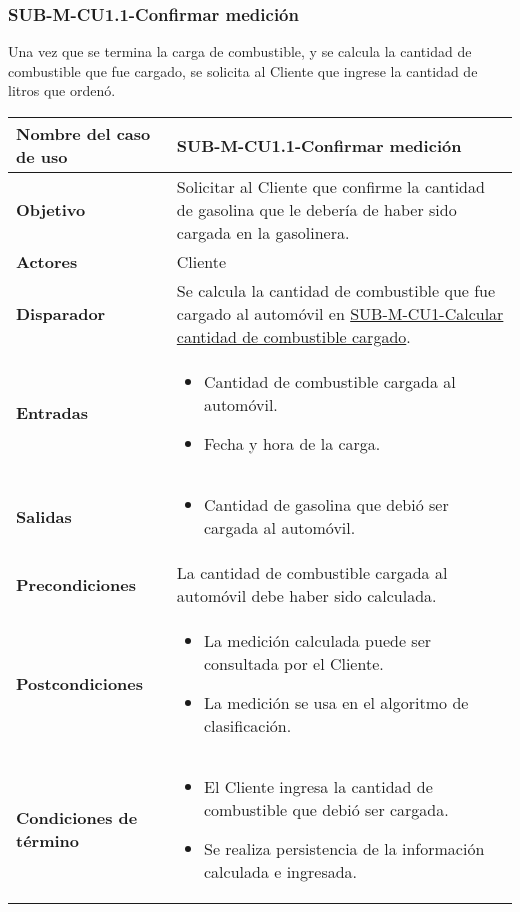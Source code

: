 \subsubsection{SUB-M-CU1.1-Confirmar medición}\label{SUB-M-CU1.1}
Una vez que se termina la carga de combustible, y se calcula la cantidad de combustible que fue cargado, se solicita al Cliente que ingrese la cantidad de litros que ordenó.

\begin{longtable}{|J{5cm}|J{10.3cm}|}
	\hline
	\textbf{Nombre del caso de uso} &
		SUB-M-CU1.1-Confirmar medición \\ \hline
	\textbf{Objetivo} &
		Solicitar al Cliente que confirme la cantidad de gasolina que le debería de haber sido cargada en la gasolinera. \\ \hline
	\textbf{Actores} &
		Cliente \\ \hline 
	\textbf{Disparador} & 
		Se calcula la cantidad de combustible que fue cargado al automóvil en \hyperref[SUB-M-CU1]{SUB-M-CU1-Calcular cantidad de combustible cargado}. \\ \hline 
	\textbf{Entradas} & 
		\begin{itemize}
				\item Cantidad de combustible cargada al automóvil.
				\item Fecha y hora de la carga.
		\end{itemize}\\ \hline 
	\textbf{Salidas} & 
		\begin{itemize}
			\item Cantidad de gasolina que debió ser cargada al automóvil.
		\end{itemize} \\ \hline
	\textbf{Precondiciones} &
		La cantidad de combustible cargada al automóvil debe haber sido calculada.\\ \hline
	\textbf{Postcondiciones} &
		\begin{itemize}
			\item La medición calculada puede ser consultada por el Cliente.
			\item La medición se usa en el algoritmo de clasificación.
		\end{itemize} \\ \hline
	\textbf{Condiciones de término} & 
		\begin{itemize}
			\item El Cliente ingresa la cantidad de combustible que debió ser cargada.
			\item Se realiza persistencia de la información calculada e ingresada.

\end{itemize}
\end{longtable}
